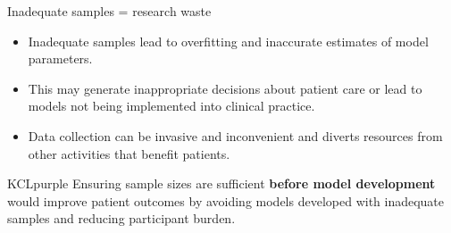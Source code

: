 \documentclass[11pt]{beamer}
\begin{document}
\begin{frame}[t]{Inadequate samples = research waste}

	\begin{itemize}
		\item Inadequate samples lead to overfitting and inaccurate estimates
		      of model parameters.


		\item This may generate inappropriate decisions about patient care or
		      lead to models not being implemented into clinical practice.

		\item Data collection can be invasive and inconvenient and diverts
		      resources from other activities that benefit patients.

	\end{itemize}

	\begin{cbox}{KCLpurple}{}
		\large
		Ensuring sample sizes are sufficient \textbf{before model development}
		would improve patient outcomes by avoiding models developed with
		inadequate samples and reducing participant burden.
	\end{cbox}

\end{frame}
\end{document}
